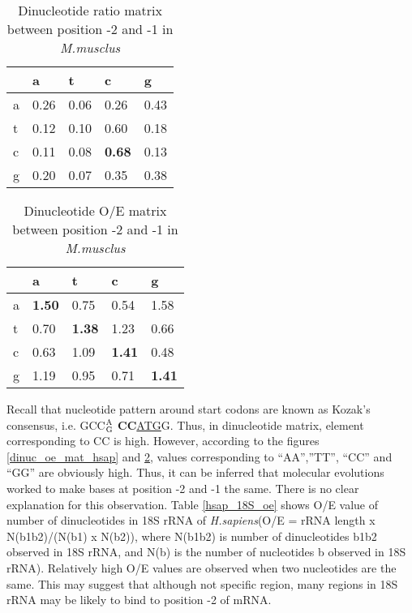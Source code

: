 \begin{table}
\begin{center}
\begin{tabular}{l|llll}
    & a  & t  & c  & g  \\
\hline
a   &0.26&0.06&0.26&0.43\\ 
t   &0.12&0.10&0.60&0.18\\ 
c   &0.11&0.08&{\bf 0.68}&0.13\\ 
g   &0.20&0.07&0.35&0.38\\
\end{tabular}
\end{center} 
\caption{Dinucleotide ratio matrix between position -2 and -1 in {\it M.musclus}}
\label{dinuc_r_mat_mmus}
\end{table}


\begin{table}
\begin{center}
\begin{tabular}{l|llll}
    & a  & t  & c  & g  \\
\hline
a  & {\bf 1.50}& 0.75 &0.54 &1.58\\ 
t  & 0.70& {\bf 1.38} &1.23 &0.66\\ 
c  & 0.63& 1.09 &{\bf 1.41} &0.48\\ 
g  & 1.19& 0.95 &0.71 &{\bf 1.41}\\
\end{tabular}
\end{center}
\caption{Dinucleotide O/E matrix between position -2 and -1 in {\it M.musclus}}
\label{dinuc_oe_mat_mmus}
\end{table}


Recall that nucleotide pattern around start codons are known as Kozak's
consensus, i.e. GCC$^{\rm A}_{\rm G}${\bf
CC}\underline{ATG}G\cite{label3}. Thus, in dinucleotide matrix, element
corresponding to CC is high. However, according to the figures
\ref{dinuc_oe_mat_hsap} and \ref{dinuc_oe_mat_mmus}, values
corresponding to ``AA'',''TT'', ``CC'' and ``GG'' are obviously
high. Thus, it can be inferred that molecular evolutions worked to make
bases at position -2 and -1 the same. There is no clear explanation for
this observation. Table \ref{hsap_18S_oe} shows O/E value of number of
dinucleotides in 18S rRNA of {\it H.sapiens}(O/E = rRNA length x
N(b1b2)/(N(b1) x N(b2)), where N(b1b2) is number of dinucleotides b1b2
observed in 18S rRNA, and N(b) is the number of nucleotides b observed in
18S rRNA). Relatively high O/E values are observed when two nucleotides
are the same. This may suggest that although not specific region, many
regions in 18S rRNA may be likely to bind to position -2 of mRNA.

